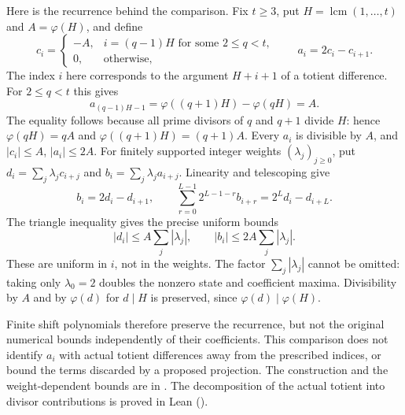 \begin{obs}\label{prop:B4b-kill}
Here is the recurrence behind the comparison. Fix $t\ge3$, put
$H=\operatorname{lcm}(1,\ldots,t)$ and $A=\varphi(H)$, and define
\[
 c_i=\begin{cases}-A,&i=(q-1)H\text{ for some }2\le q<t,\\
                   0,&\text{otherwise},\end{cases}
 \qquad a_i=2c_i-c_{i+1}.
\]
The index $i$ here corresponds to the argument $H+i+1$ of a totient
difference. For $2\le q<t$ this gives
\[
 a_{(q-1)H-1}=\varphi((q+1)H)-\varphi(qH)=A.
\]
The equality follows because all prime divisors of $q$ and $q+1$ divide
$H$: hence $\varphi(qH)=qA$ and $\varphi((q+1)H)=(q+1)A$.
Every $a_i$ is divisible by $A$, and $|c_i|\le A$, $|a_i|\le2A$.
For finitely supported integer weights $(\lambda_j)_{j\ge0}$, put
$d_i=\sum_j\lambda_j c_{i+j}$ and $b_i=\sum_j\lambda_j a_{i+j}$.
Linearity and telescoping give
\[
 b_i=2d_i-d_{i+1},\qquad
 \sum_{r=0}^{L-1}2^{L-1-r}b_{i+r}=2^Ld_i-d_{i+L}.
\]
The triangle inequality gives the precise uniform bounds
\[
 |d_i|\le A\sum_j|\lambda_j|,\qquad
 |b_i|\le2A\sum_j|\lambda_j|.
\]
These are uniform in $i$, not in the weights. The factor
$\sum_j|\lambda_j|$ cannot be omitted: taking only $\lambda_0=2$
doubles the nonzero state and coefficient maxima. Divisibility by $A$
and by $\varphi(d)$ for $d\mid H$ is preserved, since
$\varphi(d)\mid\varphi(H)$.

Finite shift polynomials therefore preserve the recurrence, but not the
original numerical bounds independently of their coefficients. This
comparison does not identify $a_i$ with actual totient differences away
from the prescribed indices, or bound the terms discarded by a proposed
projection. The construction and the weight-dependent bounds are in
.
The decomposition of the actual totient into divisor contributions is
proved in Lean
().
\end{obs}

